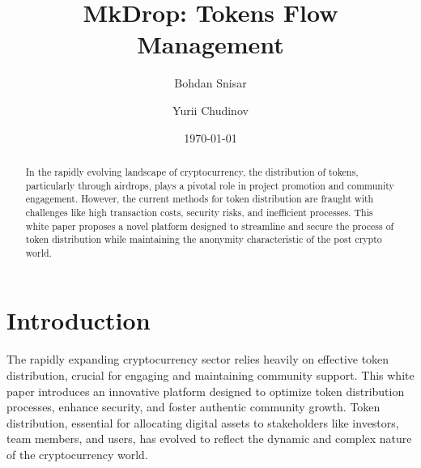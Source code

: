 \documentclass[12pt,oneside]{article}
\date{\small\today}
\title{%
  MkDrop: Tokens Flow Management\\
  \colorbox{mypink}{\small\sffamily\color{white}{White Paper}}}
\author{Bohdan Snisar \and Yurii Chudinov} %
\begin{document}
\raggedbottom

\maketitle
\begin{abstract}
  In the rapidly evolving landscape of cryptocurrency, the distribution of tokens, particularly through airdrops, 
  plays a pivotal role in project promotion and community engagement. However, the current methods for token 
  distribution   are fraught with challenges like high transaction costs, security risks, and inefficient processes. 
  This white paper proposes a novel platform designed to streamline and secure the process of token distribution 
  while maintaining the anonymity characteristic of the post crypto world.
\end{abstract}


\section{Introduction}

The rapidly expanding cryptocurrency sector relies heavily on effective token distribution,
crucial for engaging and maintaining community support. This white paper introduces an innovative 
platform designed to optimize token distribution processes, enhance security, and foster authentic 
community growth. Token distribution, essential for allocating digital assets to stakeholders like investors, 
team members, and users, has evolved to reflect the dynamic and complex nature of the cryptocurrency world.
\end{document}
